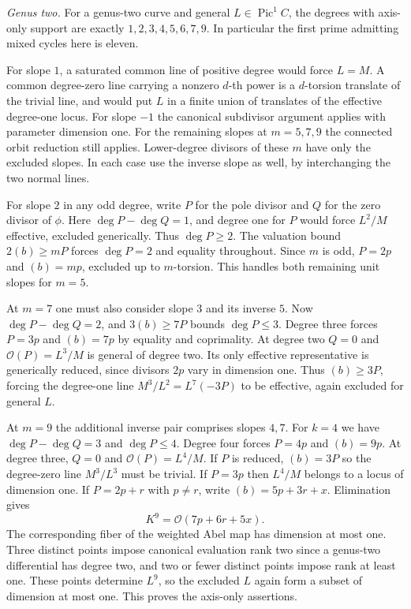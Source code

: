 \emph{Genus two.} For a genus-two curve and general $L\in\operatorname{Pic}^1 C$, the degrees with axis-only support are exactly $1,2,3,4,5,6,7,9$. In particular the first prime admitting mixed cycles here is eleven.

For slope $1$, a saturated common line of positive degree would force $L=M$. A common degree-zero line carrying a nonzero $d$-th power is a $d$-torsion translate of the trivial line, and would put $L$ in a finite union of translates of the effective degree-one locus. For slope $-1$ the canonical subdivisor argument applies with parameter dimension one. For the remaining slopes at $m=5,7,9$ the connected orbit reduction still applies. Lower-degree divisors of these $m$ have only the excluded slopes. In each case use the inverse slope as well, by interchanging the two normal lines.

For slope $2$ in any odd degree, write $P$ for the pole divisor and $Q$ for the zero divisor of $\phi$. Here $\deg P-\deg Q=1$, and degree one for $P$ would force $L^2/M$ effective, excluded generically. Thus $\deg P\ge2$. The valuation bound $2(b)\ge mP$ forces $\deg P=2$ and equality throughout. Since $m$ is odd, $P=2p$ and $(b)=mp$, excluded up to $m$-torsion. This handles both remaining unit slopes for $m=5$.

At $m=7$ one must also consider slope $3$ and its inverse $5$. Now $\deg P-\deg Q=2$, and $3(b)\ge7P$ bounds $\deg P\le3$. Degree three forces $P=3p$ and $(b)=7p$ by equality and coprimality. At degree two $Q=0$ and $\mathcal O(P)=L^3/M$ is general of degree two. Its only effective representative is generically reduced, since divisors $2p$ vary in dimension one. Thus $(b)\ge3P$, forcing the degree-one line $M^3/L^2=L^7(-3P)$ to be effective, again excluded for general $L$.

At $m=9$ the additional inverse pair comprises slopes $4,7$. For $k=4$ we have $\deg P-\deg Q=3$ and $\deg P\le4$. Degree four forces $P=4p$ and $(b)=9p$. At degree three, $Q=0$ and $\mathcal O(P)=L^4/M$. If $P$ is reduced, $(b)=3P$ so the degree-zero line $M^3/L^3$ must be trivial. If $P=3p$ then $L^4/M$ belongs to a locus of dimension one. If $P=2p+r$ with $p\ne r$, write $(b)=5p+3r+x$. Elimination gives
\[
 K^9=\mathcal O(7p+6r+5x).
\]
The corresponding fiber of the weighted Abel map has dimension at most one. Three distinct points impose canonical evaluation rank two since a genus-two differential has degree two, and two or fewer distinct points impose rank at least one. These points determine $L^9$, so the excluded $L$ again form a subset of dimension at most one. This proves the axis-only assertions.


